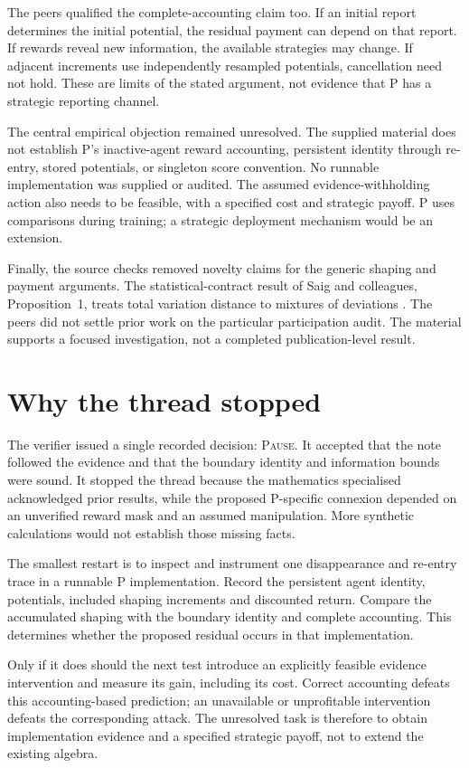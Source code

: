 \documentclass[11pt]{article}
\begin{document}
The peers qualified the complete-accounting claim too. If an initial report determines the initial potential,
the residual payment can depend on that report. If rewards reveal new information, the available strategies
may change. If adjacent increments use independently resampled potentials, cancellation need not hold. These
are limits of the stated argument, not evidence that P has a strategic reporting channel.

The central empirical objection remained unresolved. The supplied material does not establish P's
inactive-agent reward accounting, persistent identity through re-entry, stored potentials, or singleton score
convention. No runnable implementation was supplied or audited. The assumed evidence-withholding action also
needs to be feasible, with a specified cost and strategic payoff. P uses comparisons during training; a
strategic deployment mechanism would be an extension.

Finally, the source checks removed novelty claims for the generic shaping and payment arguments. The
statistical-contract result of Saig and colleagues, Proposition~1, treats total variation distance to mixtures
of deviations \cite{saig}. The peers did not settle prior work on the particular participation audit. The
material supports a focused investigation, not a completed publication-level result.

\section{Why the thread stopped}

The verifier issued a single recorded decision: \textsc{Pause}. It accepted that the note followed the
evidence and that the boundary identity and information bounds were sound. It stopped the thread because the
mathematics specialised acknowledged prior results, while the proposed P-specific connexion depended on an
unverified reward mask and an assumed manipulation. More synthetic calculations would not establish those
missing facts.

The smallest restart is to inspect and instrument one disappearance and re-entry trace in a runnable P
implementation. Record the persistent agent identity, potentials, included shaping increments and discounted
return. Compare the accumulated shaping with the boundary identity and complete accounting. This determines
whether the proposed residual occurs in that implementation.

Only if it does should the next test introduce an explicitly feasible evidence intervention and measure its
gain, including its cost. Correct accounting defeats this accounting-based prediction; an unavailable or
unprofitable intervention defeats the corresponding attack. The unresolved task is therefore to obtain
implementation evidence and a specified strategic payoff, not to extend the existing algebra.

\begingroup
\raggedright


\endgroup
\end{document}

